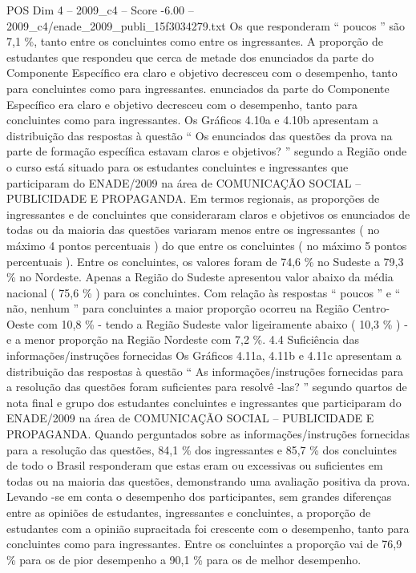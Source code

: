 \begin{textsample}{POS Dim 4 – 2009\_c4 – Score -6.00 – 2009\_c4/enade\_2009\_publi\_15f3034279.txt}
Os que responderam “ poucos ” são 7,1 \%, tanto entre os concluintes como entre os ingressantes.
A proporção de estudantes que respondeu que cerca de metade dos enunciados da parte do Componente Específico era claro e objetivo decresceu com o desempenho, tanto para concluintes como para ingressantes. enunciados da parte do Componente Específico era claro e objetivo decresceu com o desempenho, tanto para concluintes como para ingressantes.
Os Gráficos 4.10a e 4.10b apresentam a distribuição das respostas à questão “ Os enunciados das questões da prova na parte de formação específica estavam claros e objetivos? ” segundo a Região onde o curso está situado para os estudantes concluintes e ingressantes que participaram do ENADE/2009 na área de COMUNICAÇÃO SOCIAL – PUBLICIDADE E PROPAGANDA.
Em termos regionais, as proporções de ingressantes e de concluintes que consideraram claros e objetivos os enunciados de todas ou da maioria das questões variaram menos entre os ingressantes ( no máximo 4 pontos percentuais ) do que entre os concluintes ( no máximo 5 pontos percentuais ).
Entre os concluintes, os valores foram de 74,6 \% no Sudeste a 79,3 \% no Nordeste.
Apenas a Região do Sudeste apresentou valor abaixo da média nacional ( 75,6 \% ) para os concluintes.
Com relação às respostas “ poucos ” e “ não, nenhum ” para concluintes a maior proporção ocorreu na Região Centro-Oeste com 10,8 \% - tendo a Região Sudeste valor ligeiramente abaixo ( 10,3 \% ) - e a menor proporção na Região Nordeste com 7,2 \%. 4.4 Suficiência das informações/instruções fornecidas Os Gráficos 4.11a, 4.11b e 4.11c apresentam a distribuição das respostas à questão “ As informações/instruções fornecidas para a resolução das questões foram suficientes para resolvê -las? ” segundo quartos de nota final e grupo dos estudantes concluintes e ingressantes que participaram do ENADE/2009 na área de COMUNICAÇÃO SOCIAL – PUBLICIDADE E PROPAGANDA.
Quando perguntados sobre as informações/instruções fornecidas para a resolução das questões, 84,1 \% dos ingressantes e 85,7 \% dos concluintes de todo o Brasil responderam que estas eram ou excessivas ou suficientes em todas ou na maioria das questões, demonstrando uma avaliação positiva da prova.
Levando -se em conta o desempenho dos participantes, sem grandes diferenças entre as opiniões de estudantes, ingressantes e concluintes, a proporção de estudantes com a opinião supracitada foi crescente com o desempenho, tanto para concluintes como para ingressantes.
Entre os concluintes a proporção vai de 76,9 \% para os de pior desempenho a 90,1 \% para os de melhor desempenho.

\end{textsample}
